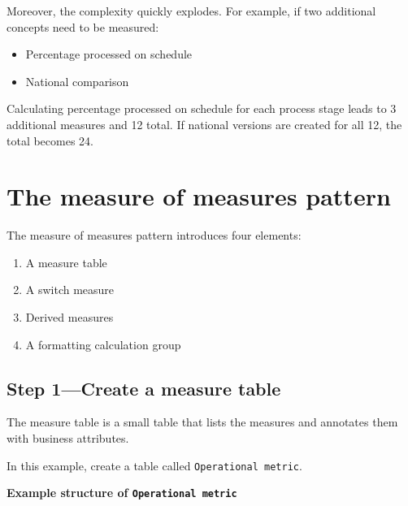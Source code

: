 \documentclass[10pt,openany,10pt]{book}
\providecommand{\tightlist}{%
  \setlength{\itemsep}{0pt}\setlength{\parskip}{0pt}}
\begin{document}
Moreover, the complexity quickly explodes. For example, if two
additional concepts need to be measured:

\begin{itemize}
\tightlist
\item
  Percentage processed on schedule
\item
  National comparison
\end{itemize}

Calculating percentage processed on schedule for each process stage
leads to 3 additional measures and 12 total. If national versions are
created for all 12, the total becomes 24.

\section{The measure of measures
pattern}\label{the-measure-of-measures-pattern}

The measure of measures pattern introduces four elements:

\begin{enumerate}
\def\labelenumi{\arabic{enumi}.}
\tightlist
\item
  A measure table
\item
  A switch measure
\item
  Derived measures
\item
  A formatting calculation group
\end{enumerate}

\subsection{Step 1---Create a measure
table}\label{step-1create-a-measure-table}

The measure table is a small table that lists the measures and annotates
them with business attributes.

In this example, create a table called
\texttt{\textquotesingle{}Operational\ metric\textquotesingle{}}.

\textbf{Example structure of
\texttt{\textquotesingle{}Operational\ metric\textquotesingle{}}}
\end{document}
